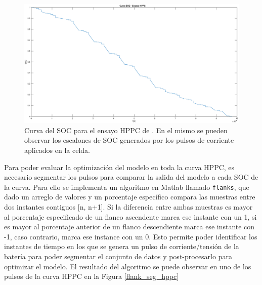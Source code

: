 \documentclass[10pt,a4paper]{article}
\newcounter{subsubsubsection}[subsubsection]
\begin{document}
\begin{figure}[h!]
    \begin{center}
        \includegraphics[width=1\textwidth]{soc_hppc_data.eps}
        \caption{Curva del \acrshort{SOC} para el ensayo HPPC de
        \cite{Kollmeyer2018}. En el mismo se pueden observar los escalones de
        \acrshort{SOC} generados por los pulsos de corriente aplicados en la
        celda.}
        \label{soc_hppc_data}
    \end{center}
\end{figure}

\label{flank_seg}

Para poder evaluar la optimizaci\'on del modelo en toda la curva 
\acrshort{HPPC}, es necesario segmentar los pulsos para comparar la salida del
modelo a cada \acrshort{SOC} de la curva. Para ello se implementa un algoritmo
en Matlab llamado \texttt{flanks}, que dado un arreglo de valores y un
porcentaje espec\'ifico compara las muestras entre dos instantes contiguos [n,
n+1]. Si la diferencia entre ambas muestras es mayor al porcentaje especificado 
de un flanco ascendente marca ese instante con un 1, si es mayor al porcentaje
anterior de un flanco descendiente marca ese instante con -1, caso contrario, 
marca ese instance con un 0. Esto permite poder identificar los instantes de 
tiempo en los que se genera un pulso de corriente/tensi\'on de la bater\'ia para 
poder segmentar el conjunto de datos y post-procesarlo para optimizar el 
modelo. El resultado del algoritmo se puede observar en uno de los pulsos de la 
curva \acrshort{HPPC} en la Figura \ref{flank_seg_hppc}
\end{document}
